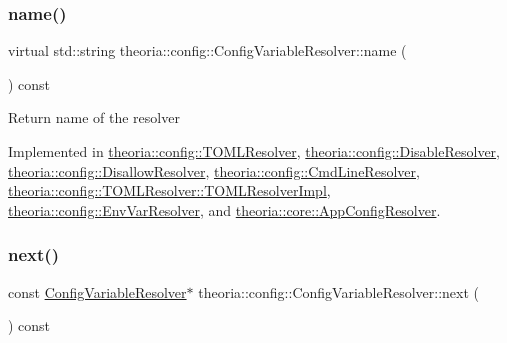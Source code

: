\subsubsection{\texorpdfstring{name()}{name()}}
{\footnotesize\ttfamily virtual std\+::string theoria\+::config\+::\+Config\+Variable\+Resolver\+::name (\begin{DoxyParamCaption}{ }\end{DoxyParamCaption}) const\hspace{0.3cm}{\ttfamily [pure virtual]}}

Return name of the resolver 

Implemented in \hyperlink{classtheoria_1_1config_1_1TOMLResolver_a6b50ff1e396f74183318915e602837fc}{theoria\+::config\+::\+T\+O\+M\+L\+Resolver}, \hyperlink{classtheoria_1_1config_1_1DisableResolver_ae7caa7a59ad2921ec2cba0544ed26ad0}{theoria\+::config\+::\+Disable\+Resolver}, \hyperlink{classtheoria_1_1config_1_1DisallowResolver_a8352df79f9e0f17fbfad8801bfdcc99e}{theoria\+::config\+::\+Disallow\+Resolver}, \hyperlink{classtheoria_1_1config_1_1CmdLineResolver_ab42f0d86e62e985ee0bc94947df46a74}{theoria\+::config\+::\+Cmd\+Line\+Resolver}, \hyperlink{classTOMLResolver_1_1TOMLResolverImpl_a5b9f36aca6c20a81b18b078fa74c3c14}{theoria\+::config\+::\+T\+O\+M\+L\+Resolver\+::\+T\+O\+M\+L\+Resolver\+Impl}, \hyperlink{classtheoria_1_1config_1_1EnvVarResolver_ab2c250e1b7866dcd618dc90f3c3eab19}{theoria\+::config\+::\+Env\+Var\+Resolver}, and \hyperlink{classtheoria_1_1core_1_1AppConfigResolver_ad7c8c08e622613c6505418774a71abda}{theoria\+::core\+::\+App\+Config\+Resolver}.

\mbox{\label{classtheoria_1_1config_1_1ConfigVariableResolver_a2861f6405c8b8e6c8c267dd490c46d2a}} 
\subsubsection{\texorpdfstring{next()}{next()}}
{\footnotesize\ttfamily const \hyperlink{classtheoria_1_1config_1_1ConfigVariableResolver}{Config\+Variable\+Resolver}$\ast$ theoria\+::config\+::\+Config\+Variable\+Resolver\+::next (\begin{DoxyParamCaption}{ }\end{DoxyParamCaption}) const\hspace{0.3cm}{\ttfamily [inline]}}

